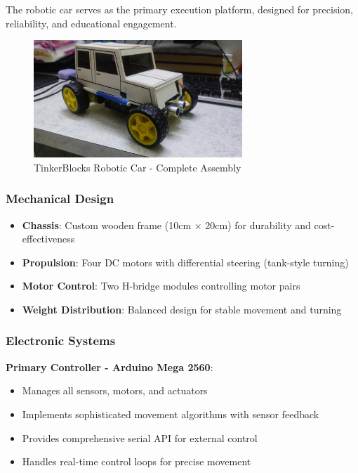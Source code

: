 The robotic car serves as the primary execution platform, designed for precision, reliability, and educational engagement.

\begin{figure}[H]
    \centering
    \includegraphics[width=0.7\textwidth]{assets/car.png}
    \caption{TinkerBlocks Robotic Car - Complete Assembly}
    \label{fig:car_complete}
\end{figure}

\subsubsection{Mechanical Design}
\begin{itemize}
    \item \textbf{Chassis}: Custom wooden frame (10cm × 20cm) for durability and cost-effectiveness
    \item \textbf{Propulsion}: Four DC motors with differential steering (tank-style turning)
    \item \textbf{Motor Control}: Two H-bridge modules controlling motor pairs
    \item \textbf{Weight Distribution}: Balanced design for stable movement and turning
\end{itemize}

\subsubsection{Electronic Systems}
\textbf{Primary Controller - Arduino Mega 2560}:
\begin{itemize}
    \item Manages all sensors, motors, and actuators
    \item Implements sophisticated movement algorithms with sensor feedback
    \item Provides comprehensive serial API for external control
    \item Handles real-time control loops for precise movement
\end{itemize}

